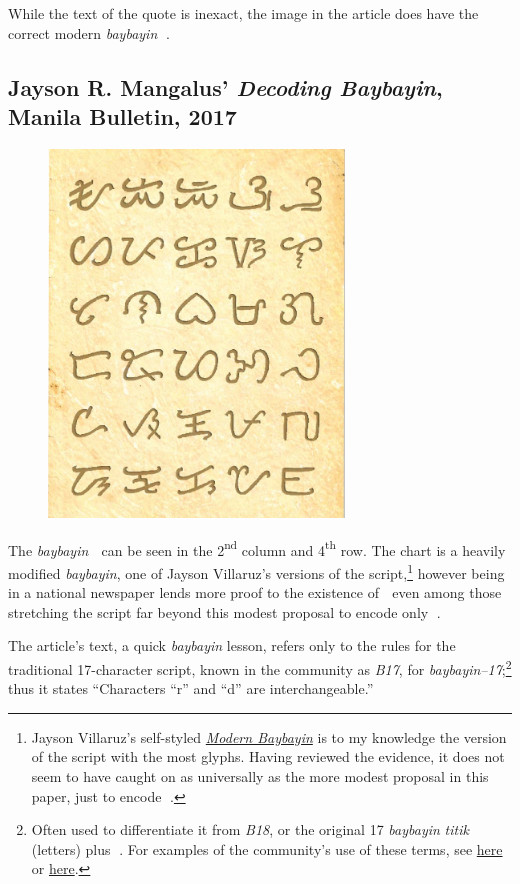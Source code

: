\documentclass[a4paper,pagesize,openany,14pt,parskip=never]{scrbook}
\newcommand{\≈}{$\approx$}
\newcommand{\ra}{{\baybayin ᜍ}}
\begin{document}
While the text of the quote is inexact, the image in the article does have the correct modern {\em baybayin} {\baybayin ᜍ}.

\subsection{Jayson R. Mangalus' {\em Decoding Baybayin}, Manila Bulletin, 2017}

\begin{figure}[H]
\includegraphics[width=0.7\textwidth]{MB}
\end{figure}

The {\em baybayin} {\baybayin ᜍ} can be seen in the 2{\textsuperscript{nd}} column and 4{\textsuperscript{th}} row. The chart is a heavily modified {\em baybayin}, one of Jayson Villaruz's versions of the script,\footnote{Jayson Villaruz's self-styled \href{http://modernbaybayin.blogspot.com/}{{\em Modern Baybayin}} is to my knowledge the version of the script with the most glyphs. Having reviewed the evidence, it does not seem to have caught on as universally as the more modest proposal in this paper, just to encode {\baybayin ᜍ}.} however being in a national newspaper lends more proof to the existence of {\baybayin ᜍ} even among those stretching the script far beyond this modest proposal to encode only {\baybayin ᜍ}.

The article's text, a quick {\em baybayin} lesson, refers only to the rules for the traditional 17-character script, known in the community as {\em B17}, for {\em baybayin--17};\footnote{Often used to differentiate it from {\em B18}, or the original 17 {\em baybayin} {\em titik} (letters) plus \ra. For examples of the community's use of these terms, see \href{https://www.facebook.com/groups/tunaynabaybayin/}{here} or \href{https://baybayinfoundry.blogspot.com/2019/03/ba18-baybayin-18-at-simbolong-ra-mula.html}{here}.} thus it states ``Characters “r” and “d” are interchangeable.''
\end{document}
